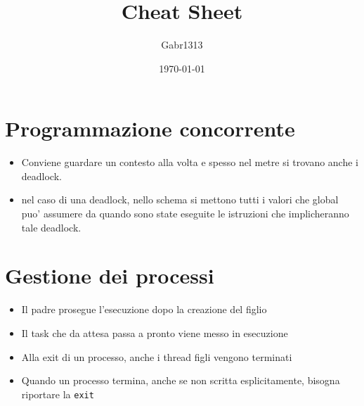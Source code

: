 \documentclass[12pt, a4paper]{report}
\title{Cheat Sheet}
\author{Gabr1313}
\date{\today}
\begin{document}
\justify
\sloppy
\maketitle

\section*{Programmazione concorrente}
\begin{itemize}
	\item Conviene guardare un contesto alla volta e spesso nel metre si trovano
		anche i deadlock.
	\item nel caso di una deadlock, nello schema si mettono tutti i valori che
		global puo' assumere da quando sono state eseguite le istruzioni che
		implicheranno tale deadlock.
\end{itemize}

\newpage
\section*{Gestione dei processi}
\begin{itemize}
	\item Il padre prosegue l'esecuzione dopo la creazione del figlio
	\item Il task che da attesa passa a pronto viene messo in esecuzione
	\item Alla exit di un processo, anche i thread figli vengono terminati
	\item Quando un processo termina, anche se non scritta esplicitamente,
		bisogna riportare la \texttt{exit}
\end{itemize}


\newpage
\end{document}
